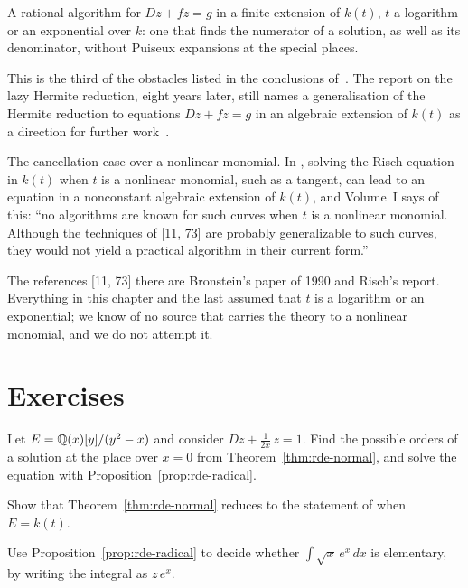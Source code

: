 \begin{openproblem}
A rational algorithm for $Dz + f z = g$ in a finite extension of $k(t)$, $t$
a logarithm or an exponential over $k$: one that finds the numerator of a
solution, as well as its denominator, without Puiseux expansions at the
special places.
\end{openproblem}

This is the third of the obstacles listed in the conclusions
of~\cite{bronstein1990}. The report on the lazy Hermite reduction, eight
years later, still names a generalisation of the Hermite reduction to
equations $Dz + fz = g$ in an algebraic extension of $k(t)$ as a direction
for further work~\cite[Conclusions]{bronstein1998lazy}.

\begin{openproblem}
The cancellation case over a nonlinear monomial. In , solving
the Risch equation in $k(t)$ when $t$ is a nonlinear monomial, such as a
tangent, can lead to an equation in a nonconstant algebraic extension of
$k(t)$, and Volume~I says of this: ``no algorithms are known for such curves
when $t$ is a nonlinear monomial. Although the techniques of [11, 73] are
probably generalizable to such curves, they would not yield a practical
algorithm in their current form.''
\end{openproblem}

The references [11, 73] there are Bronstein's paper of 1990 and Risch's
report. Everything in this chapter and the last assumed that $t$ is a
logarithm or an exponential; we know of no source that carries the theory to
a nonlinear monomial, and we do not attempt it.

\section*{Exercises}

\begin{exercise}
Let $E = \mathbb{Q}(x)[y]/(y^2 - x)$ and consider $Dz + \frac{1}{2x}\,z = 1$. Find the
possible orders of a solution at the place over $x = 0$ from
Theorem~\ref{thm:rde-normal}, and solve the equation with
Proposition~\ref{prop:rde-radical}.
\end{exercise}

\begin{exercise}
Show that Theorem~\ref{thm:rde-normal} reduces to the statement of
 when $E = k(t)$.
\end{exercise}

\begin{exercise}
Use Proposition~\ref{prop:rde-radical} to decide whether $\int \sqrt{x}\,
e^{x}\,dx$ is elementary, by writing the integral as $z\,e^x$.
\end{exercise}
